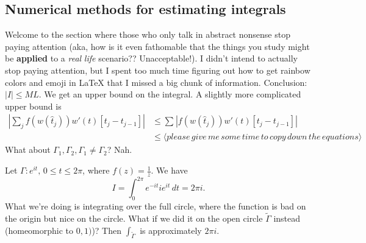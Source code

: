 \subsection{Numerical methods for estimating integrals}
Welcome to the section where those who only talk in abstract nonsense stop paying attention (aka, how is it even fathomable that the things you study might be {\color{red!70!black}\textbf{applied}} to a {\color{red}\emph{r}}{\color{orange}\emph{e}}{\color{pink}\emph{a}}{\color{green}\emph{l}} {\color{blue}\emph{l}}{\color{purple}\emph{i}}{\color{violet}\emph{f}}{\color{red}\emph{e}} scenario?? Unacceptable!). I didn't intend to actually stop paying attention, but I spent too much time figuring out how to get rainbow colors and emoji in \LaTeX{} that I missed a big chunk of information. Conclusion: $|I|\leq ML$. We get an upper bound on the integral. A slightly more complicated upper bound is 
\begin{align*}
    \left| \sum_{j}^{} f(w(\hat{t}_j))w'(t)[t_j-t_{j-1}] \right| &\leq \sum_{}^{} \left| f(w(\hat{t}_j))w'(t)[t_j-t_{j-1}] \right|\\
                                                                 &\leq \langle please \,give\, me\, some\, time \,to \,copy \,down\, the \,equations \rangle 
\end{align*}
What about $\Gamma_1,\Gamma_2, \Gamma_1\neq\Gamma_2$? Nah.
\begin{example}[important]
    Let $\Gamma \colon e^{it},\,0\leq t \leq 2 \pi$, where $f(z)=\frac{1}{z}$. We have \[
    I=\int_{0}^{2\pi} e^{-it}ie^{it} \, dt=2\pi i.
\] What we're doing is integrating over the full circle, where the function is bad on the origin but nice on the circle. What if we did it on the open circle $\widetilde{\Gamma}$ instead (homeomorphic to $0,1)$)? Then $\int _{\widetilde{\Gamma}} $ is approximately $2\pi i$.
\end{example}



